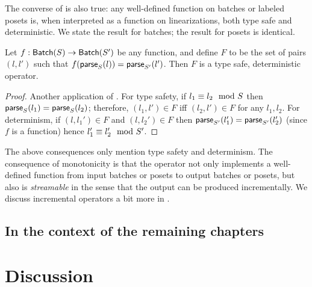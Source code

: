 The converse of  is also true: any well-defined function on batches or labeled posets is, when interpreted as a function on linearizations, both type safe and deterministic. We state the result for batches; the result for posets is identical.
\begin{theorem}
Let $f: \batch{S} \to \batch{S'}$ be any function, and define $F$
to be the set of pairs $(l, l')$ such that $f(\parselin{l}{S}) = \parselin{l'}{S'}$.
Then $F$ is a type safe, deterministic operator.
\end{theorem}
\begin{proof}
Another application of .
For type safety, if $\equivtype{l_1}{l_2}{S}$ then $\parselin{l_1}{S} = \parselin{l_2}{S}$; therefore, $(l_1, l') \in F$ iff $(l_2, l') \in F$ for any $l_1, l_2$.
For determinism, if $(l, l_1') \in F$ and $(l, l_2') \in F$ then $\parselin{l_1'}{S'} = \parselin{l_2'}{S'}$ (since $f$ is a function) hence $\equivtype{l_1'}{l_2'}{S'}$.
\end{proof}

The above consequences only mention type safety and determinism.
The consequence of monotonicity is that the operator not only implements a well-defined function from input batches or posets to output batches or posets, but also is \emph{streamable} in the sense that the output can be produced incrementally.
We discuss incremental operators a bit more in .

\subsection{In the context of the remaining chapters}


\section{Discussion}
\label{sec:types-discussion}

